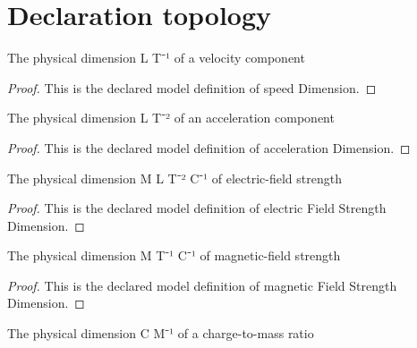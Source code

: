 \section{Declaration topology}
\begin{definition}
  \label{def:physics:phyx-mini-0561:phyxminiproblems-problemphyxmini0561-speeddimension}
  The physical dimension L T⁻¹ of a velocity component
\end{definition}
\begin{proof}
  This is the declared model definition of speed Dimension.
\end{proof}
\begin{definition}
  \label{def:physics:phyx-mini-0561:phyxminiproblems-problemphyxmini0561-accelerationdimension}
  The physical dimension L T⁻² of an acceleration component
\end{definition}
\begin{proof}
  This is the declared model definition of acceleration Dimension.
\end{proof}
\begin{definition}
  \label{def:physics:phyx-mini-0561:phyxminiproblems-problemphyxmini0561-electricfieldstrengthdimension}
  The physical dimension M L T⁻² C⁻¹ of electric-field strength
\end{definition}
\begin{proof}
  This is the declared model definition of electric Field Strength Dimension.
\end{proof}
\begin{definition}
  \label{def:physics:phyx-mini-0561:phyxminiproblems-problemphyxmini0561-magneticfieldstrengthdimension}
  The physical dimension M T⁻¹ C⁻¹ of magnetic-field strength
\end{definition}
\begin{proof}
  This is the declared model definition of magnetic Field Strength Dimension.
\end{proof}
\begin{definition}
  \label{def:physics:phyx-mini-0561:phyxminiproblems-problemphyxmini0561-chargetomassdimension}
  The physical dimension C M⁻¹ of a charge-to-mass ratio
\end{definition}
